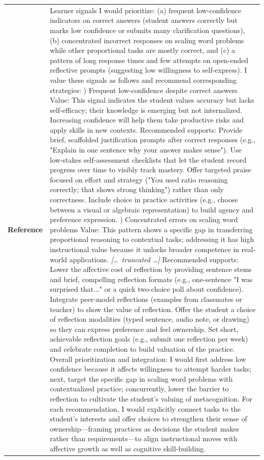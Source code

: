\begin{longtable}{@{}l p{12.5cm}@{}}
  \textbf{Reference} & Learner signals I would prioritize: (a) frequent low-confidence indicators on correct answers (student answers correctly but marks low confidence or submits many clarification questions), (b) concentrated incorrect responses on scaling word problems while other proportional tasks are mostly correct, and (c) a pattern of long response times and few attempts on open-ended reflective prompts (suggesting low willingness to self-express). I value these signals as follows and recommend corresponding strategies: \newline 1) Frequent low-confidence despite correct answers \newline Value: This signal indicates the student values accuracy but lacks self-efficacy; their knowledge is emerging but not internalized. Increasing confidence will help them take productive risks and apply skills in new contexts. \newline Recommended supports: Provide brief, scaffolded justification prompts after correct responses (e.g., "Explain in one sentence why your answer makes sense"). Use low-stakes self-assessment checklists that let the student record progress over time to visibly track mastery. Offer targeted praise focused on effort and strategy ("You used ratio reasoning correctly; that shows strong thinking") rather than only correctness. Include choice in practice activities (e.g., choose between a visual or algebraic representation) to build agency and preference expression. \newline 2) Concentrated errors on scaling word problems \newline Value: This pattern shows a specific gap in transferring proportional reasoning to contextual tasks; addressing it has high instructional value because it unlocks broader competence in real-world applications. \newline \textit{[\ldots\ truncated \ldots]} \newline Recommended supports: Lower the affective cost of reflection by providing sentence stems and brief, compelling reflection formats (e.g., one-sentence "I was surprised that..." or a quick two-choice poll about confidence). Integrate peer-model reflections (examples from classmates or teacher) to show the value of reflection. Offer the student a choice of reflection modalities (typed sentence, audio note, or drawing) so they can express preference and feel ownership. Set short, achievable reflection goals (e.g., submit one reflection per week) and celebrate completion to build valuation of the practice. \newline Overall prioritization and integration: I would first address low confidence because it affects willingness to attempt harder tasks; next, target the specific gap in scaling word problems with contextualized practice; concurrently, lower the barrier to reflection to cultivate the student's valuing of metacognition. For each recommendation, I would explicitly connect tasks to the student's interests and offer choices to strengthen their sense of ownership---framing practices as decisions the student makes rather than requirements---to align instructional moves with affective growth as well as cognitive skill-building. \\

\end{longtable}
